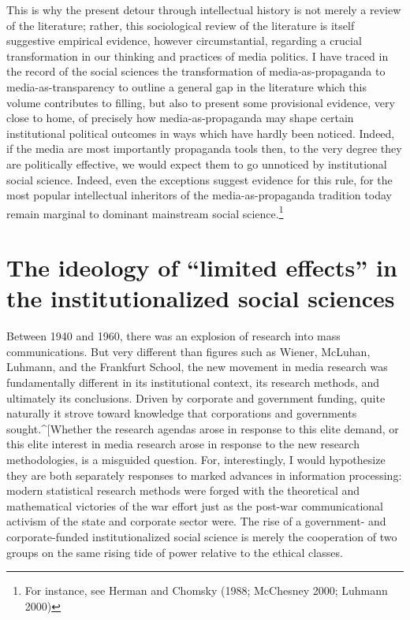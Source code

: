 \documentclass[12pt,book]{article}
\begin{document}
This is why the present detour through intellectual history is not
merely a review of the literature; rather, this sociological review of
the literature is itself suggestive empirical evidence, however
circumstantial, regarding a crucial transformation in our thinking and
practices of media politics. I have traced in the record of the social
sciences the transformation of media-as-propaganda to
media-as-transparency to outline a general gap in the literature which
this volume contributes to filling, but also to present some provisional
evidence, very close to home, of precisely how media-as-propaganda may
shape certain institutional political outcomes in ways which have hardly
been noticed. Indeed, if the media are most importantly propaganda tools
then, to the very degree they are politically effective, we would expect
them to go unnoticed by institutional social science. Indeed, even the
exceptions suggest evidence for this rule, for the most popular
intellectual inheritors of the media-as-propaganda tradition today
remain marginal to dominant mainstream social science.\footnote{For
  instance, see Herman and Chomsky (1988; McChesney 2000; Luhmann 2000)}

\section{The ideology of ``limited effects'' in the institutionalized
social
sciences}\label{the-ideology-of-limited-effects-in-the-institutionalized-social-sciences}

Between 1940 and 1960, there was an explosion of research into mass
communications. But very different than figures such as Wiener, McLuhan,
Luhmann, and the Frankfurt School, the new movement in media research
was fundamentally different in its institutional context, its research
methods, and ultimately its conclusions. Driven by corporate and
government funding, quite naturally it strove toward knowledge that
corporations and governments sought.\^{}{[}Whether the research agendas
arose in response to this elite demand, or this elite interest in media
research arose in response to the new research methodologies, is a
misguided question. For, interestingly, I would hypothesize they are
both separately responses to marked advances in information processing:
modern statistical research methods were forged with the theoretical and
mathematical victories of the war effort just as the post-war
communicational activism of the state and corporate sector were. The
rise of a government- and corporate-funded institutionalized social
science is merely the cooperation of two groups on the same rising tide
of power relative to the ethical classes.
\end{document}
